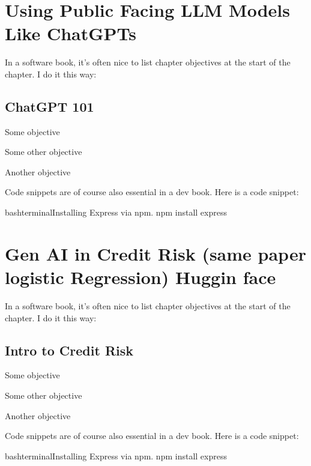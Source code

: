 \documentclass[a4paper,headinclude=on,footinclude=on,12pt,oneside]{scrbook}
\begin{document}
\chapter{ Using Public Facing LLM Models Like ChatGPTs }
In a software book, it's often nice to list chapter objectives at the start of the chapter. I do it this way:
\section{ChatGPT 101}
\begin{arrows}
	\item Some objective
	\item Some other objective
	\item Another objective
\end{arrows}


Code snippets are of course also essential in a dev book. Here is a code snippet:

\begin{codeInput}{bash}{terminal}{Installing Express via npm.}
	npm install express
\end{codeInput}




\chapter{Gen AI in Credit Risk (same paper logistic Regression) Huggin face}
In a software book, it's often nice to list chapter objectives at the start of the chapter. I do it this way:
\section{Intro to Credit Risk}
\begin{arrows}
	\item Some objective
	\item Some other objective
	\item Another objective
\end{arrows}


Code snippets are of course also essential in a dev book. Here is a code snippet:

\begin{codeInput}{bash}{terminal}{Installing Express via npm.}
	npm install express
\end{codeInput}
\end{document}
